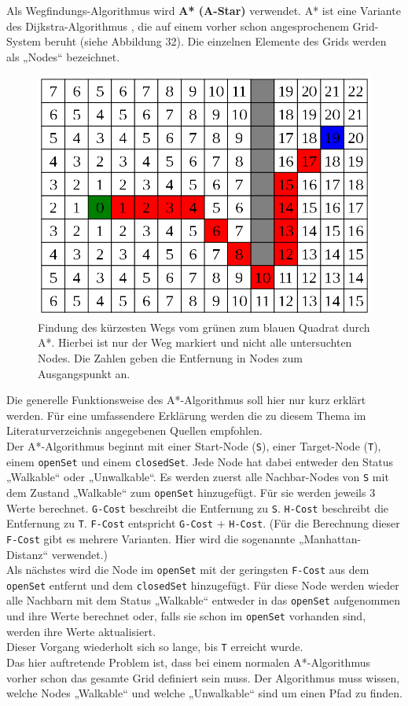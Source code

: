 \documentclass[a4paper,12pt]{article}
\newcommand{\code}{\texttt}
\begin{document}
Als Wegfindungs-Algorithmus wird \textbf{A* (A-Star)} \cite{astar} verwendet. A* ist eine Variante des Dijkstra-Algorithmus \cite{taschenbuch_der_algorithmen}, die auf einem vorher schon angesprochenem Grid-System beruht (siehe Abbildung 32). Die einzelnen Elemente des Grids werden als „Nodes“ bezeichnet.
\begin{figure}[H]
\centering
    \includegraphics[width=.8\linewidth]{Bilder/Aufgabe3/Teilaufgabe_A/AStar_01.png}
    \caption{Findung des kürzesten Wegs vom grünen zum blauen Quadrat durch A*. Hierbei ist nur der Weg markiert und nicht alle untersuchten Nodes. Die Zahlen geben die Entfernung in Nodes zum Ausgangspunkt an.}
\end{figure}

Die generelle Funktionsweise des A*-Algorithmus soll hier nur kurz erklärt werden. Für eine umfassendere Erklärung werden die zu diesem Thema im Literaturverzeichnis angegebenen Quellen empfohlen.
\\[0.4cm]
Der A*-Algorithmus beginnt mit einer Start-Node (\code{S}), einer Target-Node (\code{T}), einem \code{openSet} und einem \code{closedSet}. Jede Node hat dabei entweder den Status „Walkable“ oder „Unwalkable“. Es werden zuerst alle Nachbar-Nodes von \code{S} mit dem Zustand „Walkable“ zum \code{openSet} hinzugefügt. Für sie werden jeweils 3 Werte berechnet. \code{G-Cost} beschreibt die Entfernung zu \code{S}. \code{H-Cost} beschreibt die Entfernung zu \code{T}. \code{F-Cost} entspricht \code{G-Cost} + \code{H-Cost}. (Für die Berechnung dieser \code{F-Cost} gibt es mehrere Varianten. Hier wird die sogenannte „Manhattan-Distanz“ verwendet.)
\\[0.4cm]
Als nächstes wird die Node im \code{openSet} mit der geringsten \code{F-Cost} aus dem \code{openSet} entfernt und dem \code{closedSet} hinzugefügt. Für diese Node werden wieder alle Nachbarn mit dem Status „Walkable“ entweder in das \code{openSet} aufgenommen und ihre Werte berechnet oder, falls sie schon im \code{openSet} vorhanden sind, werden ihre Werte aktualisiert.
\\[0.4cm]
Dieser Vorgang wiederholt sich so lange, bis \code{T} erreicht wurde.
\\[0.4cm]
Das hier auftretende Problem ist, dass bei einem normalen A*-Algorithmus vorher schon das gesamte Grid definiert sein muss. Der Algorithmus muss wissen, welche Nodes „Walkable“ und welche „Unwalkable“ sind um einen Pfad zu finden.
\end{document}
